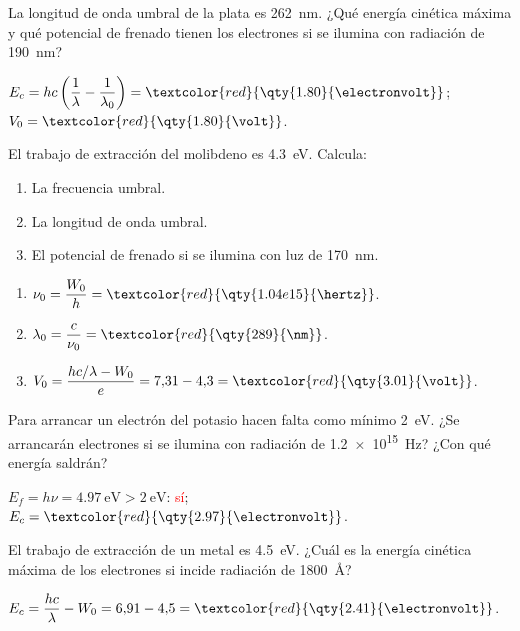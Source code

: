 \begin{exercise}
    La longitud de onda umbral de la plata es \qty{262}{\nm}. ¿Qué energía cinética máxima y qué potencial de frenado tienen los electrones
    si se ilumina con radiación de \qty{190}{\nm}?
    \begin{solu}
        \(E_c = hc\left(\dfrac{1}{\lambda} - \dfrac{1}{\lambda_0}\right) = \textcolor{red}{\qty{1.80}{\electronvolt}}\); \(V_0 = \textcolor{red}{\qty{1.80}{\volt}}\).
    \end{solu}
\end{exercise}

\begin{exercise}
    El trabajo de extracción del molibdeno es \qty{4.3}{\electronvolt}. Calcula:
    \begin{enumerate}[label=\letraminuscula]
        \item La frecuencia umbral.
        \item La longitud de onda umbral.
        \item El potencial de frenado si se ilumina con luz de \qty{170}{\nm}.
    \end{enumerate}
    \begin{solu}
        \begin{enumerate}[label=\letraminuscula]
            \item \(\nu_0 = \dfrac{W_0}{h} = \textcolor{red}{\qty{1.04e15}{\hertz}}\).
            \item \(\lambda_0 = \dfrac{c}{\nu_0} = \textcolor{red}{\qty{289}{\nm}}\).
            \item \(V_0 = \dfrac{hc/\lambda - W_0}{e} = 7{,}31 - 4{,}3 = \textcolor{red}{\qty{3.01}{\volt}}\).
        \end{enumerate}
    \end{solu}
\end{exercise}

\begin{exercise}
    Para arrancar un electrón del potasio hacen falta como mínimo \qty{2}{\electronvolt}. ¿Se arrancarán electrones si se ilumina con
    radiación de \qty{1.2e15}{\hertz}? ¿Con qué energía saldrán?
    \begin{solu}
        \(E_f = h\nu = \qty{4.97}{\electronvolt} > \qty{2}{\electronvolt}\): \textcolor{red}{sí}; \(E_c = \textcolor{red}{\qty{2.97}{\electronvolt}}\).
    \end{solu}
\end{exercise}

\begin{exercise}
    El trabajo de extracción de un metal es \qty{4.5}{\electronvolt}. ¿Cuál es la energía cinética máxima de los electrones si incide
    radiación de \qty{1800}{\angstrom}?
    \begin{solu}
        \(E_c = \dfrac{hc}{\lambda} - W_0 = 6{,}91 - 4{,}5 = \textcolor{red}{\qty{2.41}{\electronvolt}}\).
    \end{solu}
\end{exercise}


